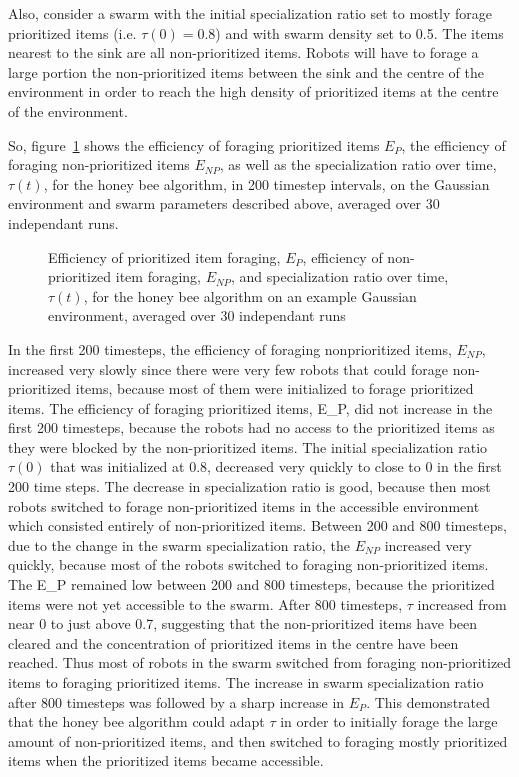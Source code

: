 Also, consider a swarm with the initial specialization ratio set to mostly forage prioritized items (i.e. $\tau(0)=0.8$) and with swarm density set to 0.5. The items nearest to the sink are all non-prioritized items. Robots will have to forage a large portion the non-prioritized items between the sink and the centre of the environment in order to reach the high density of prioritized items at the centre of the environment. 


So, figure~\ref{fig:gaussianhighdensityperformancehoneybee} shows the efficiency of foraging prioritized items $E_P$, the efficiency of foraging non-prioritized items $E_{NP}$, as well as the specialization ratio over time, $\tau(t)$, for the honey bee algorithm, in 200 timestep intervals, on the Gaussian environment and swarm parameters described above, averaged over 30 independant runs.


\begin{figure}[!htb]
\centering
\small
\resizebox{\textwidth}{!}{}
\caption{Efficiency of prioritized item foraging, $E_P$, efficiency of non-prioritized item foraging, $E_{NP}$, and specialization ratio over time, $\tau(t)$, for the honey bee algorithm on an example Gaussian environment, averaged over 30 independant runs}
\label{fig:gaussianhighdensityperformancehoneybee}
\end{figure}

In the first 200 timesteps, the efficiency of foraging nonprioritized items, $E_{NP}$, increased very slowly since there were very few robots that could forage non-prioritized items, because most of them were initialized to forage prioritized items. The efficiency of foraging prioritized items, E_{P}, did not increase in the first 200 timesteps, because the robots had no access to the prioritized items as they were blocked by the non-prioritized items. The initial specialization ratio $\tau(0)$ that was initialized at 0.8, decreased very quickly to close to 0 in the first 200 time steps. The decrease in specialization ratio is good, because then most robots switched to forage non-prioritized items in the accessible environment which consisted entirely of non-prioritized items. Between 200 and 800 timesteps, due to the change in the swarm specialization ratio, the $E_{NP}$ increased very quickly, because most of the robots switched to foraging non-prioritized items. The E_{P} remained low between 200 and 800 timesteps, because the prioritized items were not yet accessible to the swarm. After 800 timesteps, $\tau$ increased from near 0 to just above 0.7, suggesting that the non-prioritized items have been cleared and the concentration of prioritized items in the centre have been reached. Thus most of robots in the swarm switched from foraging non-prioritized items to foraging prioritized items. The increase in swarm specialization ratio after 800 timesteps was followed by a sharp increase in $E_P$. This demonstrated that the honey bee algorithm could adapt $\tau$ in order to initially forage the large amount of non-prioritized items, and then switched to foraging mostly prioritized items when the prioritized items became accessible.

